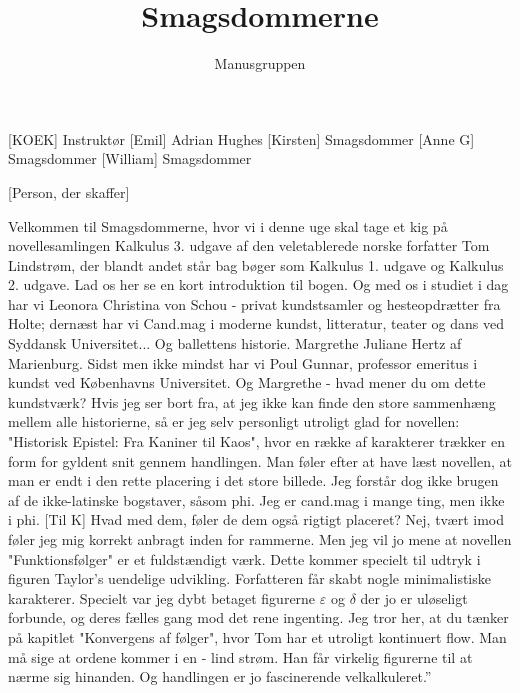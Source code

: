 \documentclass[a4paper,11pt]{article}
\title{Smagsdommerne}
\author{Manusgruppen}
\begin{document}
\maketitle

\begin{roles}
[KOEK] Instruktør
[Emil] Adrian Hughes
[Kirsten] Smagsdommer
[Anne G] Smagsdommer
[William] Smagsdommer
\end{roles}

\begin{props}
[Person, der skaffer]
\end{props}


\begin{sketch}
 Velkommen til Smagsdommerne, hvor vi i denne uge skal tage et kig på novellesamlingen Kalkulus 3. udgave af den veletablerede norske forfatter Tom Lindstrøm, der blandt andet står bag bøger som Kalkulus 1. udgave og Kalkulus 2. udgave. Lad os her se en kort introduktion til bogen.
 Og med os i studiet i dag har vi Leonora Christina von Schou - privat kundstsamler og hesteopdrætter fra Holte; dernæst har vi Cand.mag i moderne kundst, litteratur, teater og dans ved Syddansk Universitet...
 Og ballettens historie.
 Margrethe Juliane Hertz af Marienburg. Sidst men ikke mindst har vi Poul Gunnar, professor emeritus i kundst ved Københavns Universitet.
 Og Margrethe - hvad mener du om dette kundstværk?
 Hvis jeg ser bort fra, at jeg ikke kan finde den store sammenhæng mellem alle historierne, så er jeg selv personligt utroligt glad for novellen: "Historisk Epistel: Fra Kaniner til Kaos", hvor en række af karakterer trækker en form for gyldent snit gennem handlingen. Man føler efter at have læst novellen, at man er endt i den rette placering i det store billede. Jeg forstår dog ikke brugen af de ikke-latinske bogstaver, såsom phi. Jeg er cand.mag i mange ting, men ikke i phi.
[Til K] Hvad med dem, føler de dem også rigtigt placeret?
 Nej, tvært imod føler jeg mig korrekt anbragt inden for rammerne. Men jeg vil jo mene at novellen "Funktionsfølger" er et fuldstændigt værk. Dette kommer specielt til udtryk i figuren Taylor's uendelige udvikling. Forfatteren får skabt nogle minimalistiske karakterer. Specielt var jeg dybt betaget figurerne $\varepsilon$ og $\delta$ der jo er uløseligt forbunde, og deres fælles gang mod det rene ingenting.
 Jeg tror her, at du tænker på kapitlet "Konvergens af følger", hvor Tom har et utroligt kontinuert flow. Man må sige at ordene kommer i en - lind strøm. Han får virkelig figurerne til at nærme sig hinanden. Og handlingen er jo fascinerende velkalkuleret.”

\end{sketch}
\end{document}
